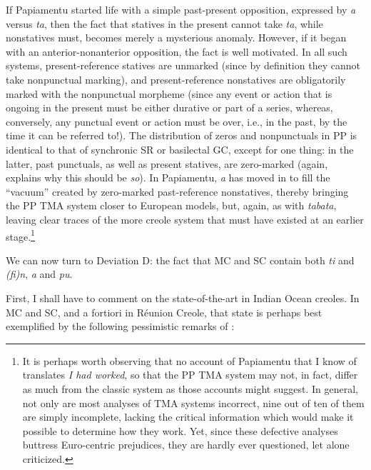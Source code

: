 \z

\z

\label{ex:2:102}\z{}

If Papiamentu started life with a simple past-present opposition,
expressed by \textit{a} versus \textit{ta}, then the fact that statives in the present cannot take \textit{ta}, while nonstatives must, becomes merely a mysterious anomaly. However, if it began with an anterior-nonanterior opposition, the fact is well motivated. In all such systems, present-reference statives are unmarked (since by definition they cannot take nonpunctual mark\-ing), and present-reference nonstatives are obligatorily marked with the nonpunctual morpheme (since any event or action that is ongoing in the present must be either durative or part of a series, whereas, con\-versely, any punctual event or action must be over, i.e., in the past, by the time it can be referred to!). The distribution of zeros and nonpunctuals in PP is identical to that of synchronic SR or basilectal GC, except for one thing: in the latter, past punctuals, as well as present statives, are zero-marked (again, \citet[Chapter 2]{Bickerton1975} explains why this should be \textit{so}). In Papiamentu, \textit{a} has moved in to fill the ``vacuum'' created by zero-marked past-reference nonstatives, thereby bringing the PP TMA system closer to European models, but, again, as with \textit{tabata}, leaving clear traces of the more creole system that must have existed at an earlier stage.\footnote{It is perhaps worth observing that no account of Papiamentu that I know of translates \textit{I had worked}, so that the PP TMA system may not, in fact, differ as much from the classic system as those ac\-counts might suggest. In general, not only are most analyses of TMA systems incorrect, nine out of ten of them are simply incomplete, lacking the critical information which would make it possible to deter\-mine how they work. Yet, since these defective analyses buttress Euro-centric prejudices, they are hardly ever questioned, let alone criticized.}

We can now turn to Deviation D: the fact that MC and SC contain both \textit{ti} and \textit{(fi)n}, \textit{a} and \textit{pu}.

First, I shall have to comment on the state-of-the-art in Indian Ocean creoles. In MC and SC, and a fortiori in Réunion Creole, that state is perhaps best exemplified by the following pessimistic remarks of \citet[94--95]{Corne1977}:

